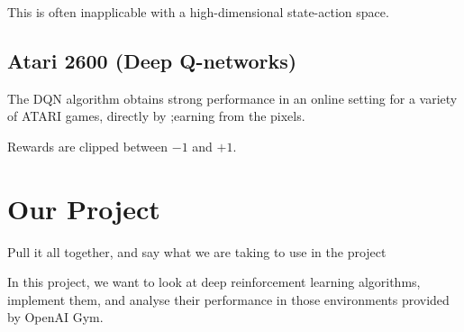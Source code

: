 \documentclass{article}
\begin{document}
This is often inapplicable with a high-dimensional state-action space.

\subsection{Atari 2600 (Deep Q-networks)}

The DQN algorithm obtains strong performance in an online setting for a variety of ATARI games, directly by ;earning from the pixels.

Rewards are clipped between $-1$ and $+1$.

\section{Our Project}

Pull it all together, and say what we are taking to use in the project

In this project, we want to look at deep reinforcement learning algorithms, implement them, and analyse their performance in those environments provided by OpenAI Gym.

\printbibliography
\end{document}

